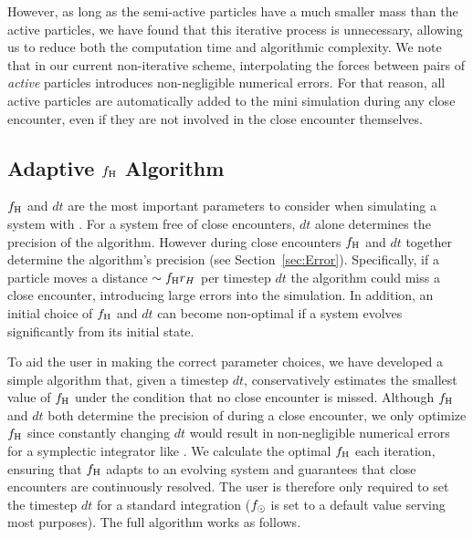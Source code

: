 However, as long as the semi-active particles have a much smaller mass than the active particles, we have found that this iterative process is unnecessary, allowing us to reduce both the computation time and algorithmic complexity.
We note that in our current non-iterative scheme, interpolating the forces between pairs of {\it active} particles introduces non-negligible numerical errors.
For that reason, all active particles are automatically added to the mini simulation during any close encounter, even if they are not involved in the close encounter themselves.

\subsection{Adaptive $f_{\rm H}$ Algorithm}
\label{sec:HSFop}
$f_{\rm H}$ and $dt$ are the most important parameters to consider when simulating a system with \hermes.
For a system free of close encounters, $dt$ alone determines the precision of the algorithm. 
However during close encounters $f_{\rm H}$ and $dt$ together determine the algorithm's precision (see Section~\ref{sec:Error}). 
Specifically, if a particle moves a distance $\sim f_{\rm H} r_H$ per timestep $dt$ the algorithm could miss a close encounter, introducing large errors into the simulation. 
In addition, an initial choice of $f_{\rm H}$ and $dt$ can become non-optimal if a system evolves significantly from its initial state. 

To aid the user in making the correct parameter choices, we have developed a simple algorithm that, given a timestep $dt$, conservatively estimates the smallest value of $f_{\rm H}$ under the condition that no close encounter is missed.
Although $f_{\rm H}$ and $dt$ both determine the precision of \hermes during a close encounter, we only optimize $f_{\rm H}$ since constantly changing $dt$ would result in non-negligible numerical errors for a symplectic integrator like \whfast.
We calculate the optimal $f_{\rm H}$ each iteration, ensuring that $f_{\rm H}$ adapts to an evolving system and guarantees that close encounters are continuously resolved.
The user is therefore only required to set the timestep $dt$ for a standard integration ($f_{\rm \odot}$ is set to a default value serving most purposes).
The full algorithm works as follows.

